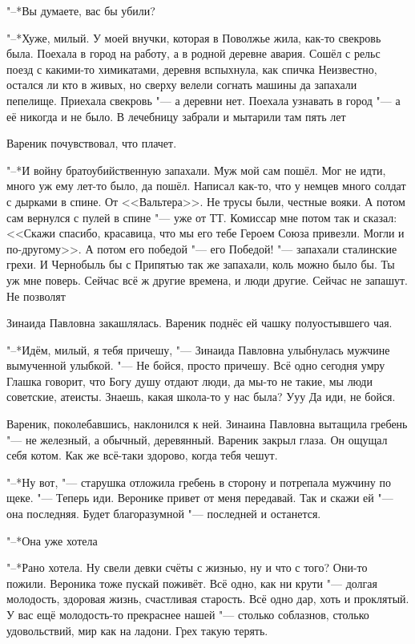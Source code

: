 "--*Вы думаете, вас бы убили?

"--*Хуже, милый.
У моей внучки, которая в Поволжье жила, как-то свекровь была.
Поехала в город на работу, а в родной деревне авария.
Сошёл с рельс поезд с какими-то химикатами, деревня вспыхнула, как спичка\ldotst
Неизвестно, остался ли кто в живых, но сверху велели согнать машины да запахали пепелище. 
Приехала свекровь "--- а деревни нет.
Поехала узнавать в город "--- а её никогда и не было.
В лечебницу забрали и мытарили там пять лет\ldotst

Вареник почувствовал, что плачет.

"--*И войну братоубийственную запахали.
Муж мой сам пошёл.
Мог не идти, много уж ему лет-то было, да пошёл.
Написал как-то, что у немцев много солдат с дырками в спине.
От <<Вальтера>>.
Не трусы были, честные вояки.
А потом сам вернулся с пулей в спине "--- уже от ТТ.
Комиссар мне потом так и сказал: <<Скажи спасибо, красавица, что мы его тебе Героем Союза привезли.
Могли и по-другому>>.
А потом его победой "--- его Победой! "--- запахали сталинские грехи. 
И Чернобыль бы с Припятью так же запахали, коль можно было бы.
Ты уж мне поверь. 
Сейчас всё ж другие времена, и люди другие.
Сейчас не запашут.
Не позволят\ldotst

Зинаида Павловна закашлялась.
Вареник поднёс ей чашку полуостывшего чая.

"--*Идём, милый, я тебя причешу, "--- Зинаида Павловна улыбнулась мужчине вымученной улыбкой.
"--- Не бойся, просто причешу.
Всё одно сегодня умру\ldotst
Глашка говорит, что Богу душу отдают люди, да мы-то не такие, мы люди советские, атеисты.
Знаешь, какая школа-то у нас была?
Ууу\ldotst
Да иди, не бойся.

Вареник, поколебавшись, наклонился к ней.
Зинаина Павловна вытащила гребень "--- не железный, а обычный, деревянный.
Вареник закрыл глаза.
Он ощущал себя котом.
Как же всё-таки здорово, когда тебя чешут.

"--*Ну вот, "--- старушка отложила гребень в сторону и потрепала мужчину по щеке.
"--- Теперь иди.
Веронике привет от меня передавай.
Так и скажи ей "--- она последняя.
Будет благоразумной "--- последней и останется.

"--*Она уже хотела\ldotst

"--*Рано хотела.
Ну свели девки счёты с жизнью, ну и что с того?
Они-то пожили.
Вероника тоже пускай поживёт.
Всё одно, как ни крути "--- долгая молодость, здоровая жизнь, счастливая старость.
Всё одно дар, хоть и проклятый.
У вас ещё молодость-то прекраснее нашей "--- столько соблазнов, столько удовольствий, мир как на ладони.
Грех такую терять.

